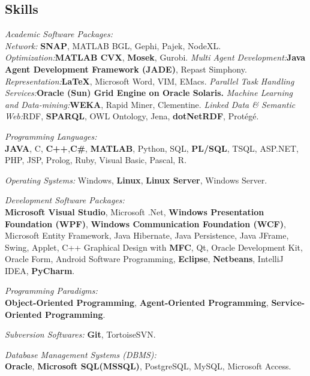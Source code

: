 \documentclass[letter]{res}
\begin{document}
\begin{resume}
\section{Skills}
\textit{Academic Software Packages:}\\
{\sl Network:} \textbf{SNAP}, MATLAB BGL, Gephi, Pajek, NodeXL.
{\sl Optimization:}\textbf{MATLAB CVX}, \textbf{Mosek}, Gurobi.
{\sl Multi Agent Development:}\textbf{Java Agent Development Framework (JADE)}, Repast Simphony.
{\sl Representation:}\textbf{\LaTeX}, Microsoft Word, VIM, EMacs.
{\sl Parallel Task Handling Services:}{\textbf{Oracle (Sun) Grid Engine on Oracle Solaris.}}
{\sl Machine Learning and Data-mining:}{\textbf{WEKA}, Rapid Miner, Clementine.}
{\sl Linked Data \& Semantic Web:}{RDF, \textbf{SPARQL}, OWL Ontology, Jena,
\textbf{dotNetRDF}, Prot\'{e}g\'{e}.}
\vspace{-4mm}

\textit{Programming Languages:}\\
\textbf{JAVA}, C, \textbf{C++},\textbf{C\#}, \textbf{MATLAB}, Python, SQL, \textbf{PL/SQL}, TSQL, ASP.NET, PHP, JSP, Prolog, Ruby, Visual Basic, Pascal, R.
\vspace{-4mm}

\textit{Operating Systems:} Windows, \textbf{Linux}, \textbf{Linux Server}, Windows Server.
\vspace{-4mm}

\textit{Development Software Packages:}\\
\textbf{Microsoft Visual Studio}, Microsoft .Net, \textbf{Windows Presentation Foundation (WPF)}, \textbf{Windows Communication Foundation (WCF)}, Microsoft Entity Framework,
Java Hibernate, Java Persistence, Java JFrame, Swing, Applet, C++ Graphical Design with \textbf{MFC}, Qt, Oracle Development Kit, Oracle Form, Android Software Programming, \textbf{Eclipse}, \textbf{Netbeans}, IntelliJ IDEA, \textbf{PyCharm}.\\
\vspace{-8mm}

\textit{Programming Paradigms:}\\
\textbf{Object-Oriented Programming}, \textbf{Agent-Oriented Programming}, \textbf{Service-Oriented Programming}.
\vspace{-4mm}

\textit{Subversion Softwares:} \textbf{Git}, TortoiseSVN.
\vspace{-4mm}
 
\textit{Database Management Systems (DBMS):}\\
\textbf{Oracle}, \textbf{Microsoft SQL(MSSQL)}, PostgreSQL, MySQL, Microsoft Access.
\vspace{-2mm}
 

\end{resume}
\end{document}
